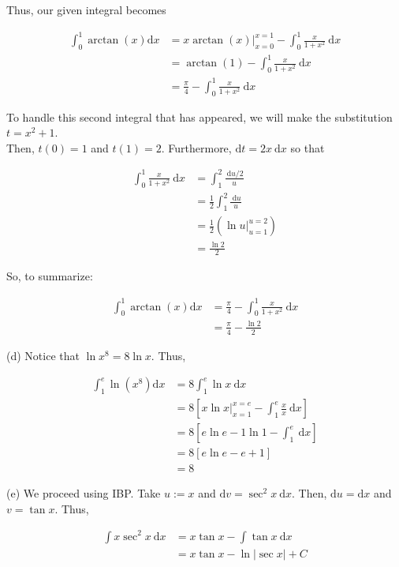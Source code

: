 \documentclass[10pt]{article}
\begin{document}
Thus, our given integral becomes

$$
\begin{aligned}
\int_{0}^{1} \arctan (x) \mathrm{d} x & =\left.x \arctan (x)\right|_{x=0} ^{x=1}-\int_{0}^{1} \frac{x}{1+x^{2}} \mathrm{~d} x \\
& =\arctan (1)-\int_{0}^{1} \frac{x}{1+x^{2}} \mathrm{~d} x \\
& =\frac{\pi}{4}-\int_{0}^{1} \frac{x}{1+x^{2}} \mathrm{~d} x
\end{aligned}
$$

To handle this second integral that has appeared, we will make the substitution $t=x^{2}+1$.\\
Then, $t(0)=1$ and $t(1)=2$. Furthermore, $\mathrm{d} t=2 x \mathrm{~d} x$ so that

$$
\begin{aligned}
\int_{0}^{1} \frac{x}{1+x^{2}} \mathrm{~d} x & =\int_{1}^{2} \frac{\mathrm{~d} u / 2}{u} \\
& =\frac{1}{2} \int_{1}^{2} \frac{\mathrm{~d} u}{u} \\
& =\frac{1}{2}\left(\left.\ln u\right|_{u=1} ^{u=2}\right) \\
& =\frac{\ln 2}{2}
\end{aligned}
$$

So, to summarize:

$$
\begin{aligned}
\int_{0}^{1} \arctan (x) \mathrm{d} x & =\frac{\pi}{4}-\int_{0}^{1} \frac{x}{1+x^{2}} \mathrm{~d} x \\
& =\frac{\pi}{4}-\frac{\ln 2}{2}
\end{aligned}
$$

(d) Notice that $\ln x^{8}=8 \ln x$. Thus,

$$
\begin{aligned}
\int_{1}^{e} \ln \left(x^{8}\right) \mathrm{d} x & =8 \int_{1}^{e} \ln x \mathrm{~d} x \\
& =8\left[\left.x \ln x\right|_{x=1} ^{x=e}-\int_{1}^{e} \frac{x}{x} \mathrm{~d} x\right] \\
& =8\left[e \ln e-1 \ln 1-\int_{1}^{e} \mathrm{~d} x\right] \\
& =8[e \ln e-e+1] \\
& =8
\end{aligned}
$$

(e) We proceed using IBP. Take $u:=x$ and $\mathrm{d} v=\sec ^{2} x \mathrm{~d} x$. Then, $\mathrm{d} u=\mathrm{d} x$ and $v=\tan x$. Thus,

$$
\begin{aligned}
\int x \sec ^{2} x \mathrm{~d} x & =x \tan x-\int \tan x \mathrm{~d} x \\
& =x \tan x-\ln |\sec x|+C
\end{aligned}
$$
\end{document}

